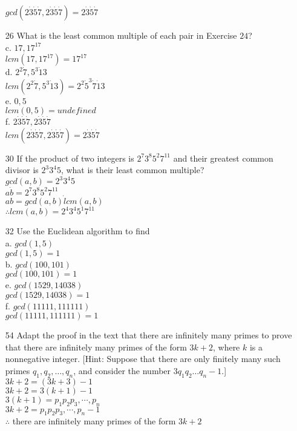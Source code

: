\documentclass[a4paper]{article}
\newcommand\tab[1][0.5cm]{\hspace*{#1}}
\begin{document}
\begin{itemize}
      \tab $gcd(2 \dot 3 \dot 5 \dot 7, 2 \dot 3 \dot 5 \dot 7) = 2 \dot 3 \dot 5 \dot 7$
    \item[26] What is the least common multiple of each pair in Exercise $24$? \\
      c. $17, 17^{17}$ \\
      \tab $lcm(17, 17^{17}) = 17^{17}$ \\
      d. $2^{2} \dot 7, 5^{3} \dot 13$ \\
      \tab $lcm(2^{2} \dot 7, 5^{3} \dot 13) = 2^{2} \dot 5^{3} \dot 7 \dot 13$ \\
      e. $0, 5$ \\
      \tab $lcm(0, 5) = undefined$ \\
      f. $2 \dot 3 \dot 5 \dot 7, 2 \dot 3 \dot 5 \dot 7$ \\
      \tab $lcm(2 \dot 3 \dot 5 \dot 7, 2 \dot 3 \dot 5 \dot 7) = 2 \dot 3 \dot 5 \dot 7$
    \item[30] If the product of two integers is $2^{7}3^{8}5^{2}7^{11}$ and their greatest common divisor is $2^{3}3^{4}5$, what is their least common multiple? \\
    \tab $gcd(a, b) = 2^{3}3^{4}5$ \\
    \tab $a \dot b = 2^{7}3^{8}5^{2}7^{11}$ \\
    \tab $ab = gcd(a, b) \dot lcm(a, b)$ \\
    \tab $\therefore lcm(a, b) = 2^{4}3^{4}5^{1}7^{11}$
    \item[32] Use the Euclidean algorithm to find \\
      a. $gcd(1, 5)$ \\
      \tab $gcd(1, 5) = 1$ \\
      b. $gcd(100, 101)$ \\
      \tab $gcd(100, 101) = 1$ \\
      e. $gcd(1529, 14038)$ \\
      \tab $gcd(1529, 14038) = 1$ \\
      f. $gcd(11111, 111111)$ \\
      \tab $gcd(11111, 111111) = 1$
    \item[54] Adapt the proof in the text that there are infinitely many primes to prove that there are infinitely many primes of the form $3k + 2$, where $k$ is a nonnegative integer. [Hint: Suppose that there are only finitely many such primes $q_{1}, q_{2}, \dots , q_{n}$, and consider the number $3q_{1}q_{2} \dots q_{n} - 1$.] \\
    \tab $3k + 2 = (3k + 3) -1$ \\
    \tab $3k + 2 = 3(k + 1) - 1$ \\
    \tab $3(k + 1) = p_{1}p_{2}p_{3}, \cdots, p_{n}$ \\
    \tab $3k + 2 = p_{1}p_{2}p_{3}, \cdots, p_{n} - 1$ \\
    \tab $\therefore$ there are infinitely many primes of the form $3k + 2$ 
  \end{itemize}
 

  
  
\end{document}
